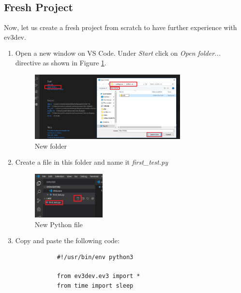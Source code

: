 \documentclass{scrartcl}
\begin{document}
\subsection{Fresh Project}
Now, let us create a fresh project from scratch to have further experience with ev3dev.

\begin{enumerate}
    \item Open a new window on VS Code. Under \textit{Start} click on \textit{Open folder...} directive as shown in Figure \ref{fig:fol}.
        \begin{figure}[h!]
            \begin{center}
              \includegraphics[width=0.75\textwidth]{fol.jpg}
              \caption{New folder}
              \label{fig:fol}
            \end{center}
        \end{figure}
    \item Create a file in this folder and name it \textit{first\_test.py}
        \begin{figure}[h!]
            \begin{center}
              \includegraphics[width=0.35\textwidth]{ft.jpg}
              \caption{New Python file}
              \label{fig:ft}
            \end{center}
        \end{figure}
        
    \item Copy and paste the following code:
        \begin{lstlisting}
            #!/usr/bin/env python3

            from ev3dev.ev3 import *
            from time import sleep
            

\end{lstlisting}
\end{enumerate}
\end{document}
